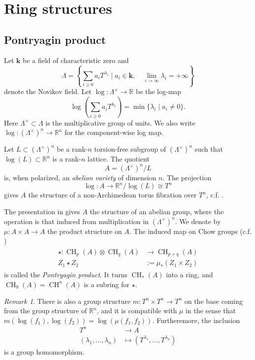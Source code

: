 \documentclass[10pt]{amsart}
\theoremstyle{definition}
\theoremstyle{remark}
\newtheorem{rmk}[thm]{Remark}
\def\R{\mathbb{R}}
\DeclareMathOperator{\CH}{CH}
\def\x{\times}
\begin{document}
  
\section{Ring structures}
\subsection{Pontryagin product}\label{sec:pontryagin}
Let $\mathbf k$ be a field of characteristic zero and 
$$
\Lambda = \left\lbrace \sum_{i\geq0} a_i T^{\lambda_i} \mid a_i \in \mathbf{k},\quad \lim_{i\to\infty} \lambda_i =+\infty\right\rbrace
$$
denote the Novikov field.
Let $\log : \Lambda^\x \to \R$ be the log-map
$$
    \log\left(\sum_{i\geq0} a_i T^{\lambda_i}\right) = \min\lbrace \lambda_i \mid a_i \neq 0\rbrace.
$$
Here $\Lambda^\x \subset \Lambda$ is the multiplicative group of units.
We also write $\log: (\Lambda^\x)^n \to \R^n$ for the component-wise log map.

Let $L \subset (\Lambda^\x)^n$ be a rank-$n$ torsion-free subgroup of $(\Lambda^\x)^n$ such that $\log(L) \subset \R^n$ is a rank-$n$ lattice. 
The quotient 
\begin{equation}\label{eq:Aisquotient}
    A = (\Lambda^\x)^n / L
\end{equation}
is, when polarized, an \emph{abelian variety} of dimension $n$.
The projection
$$
\log : A \to \R^n/\log(L) \cong T^n
$$
gives $A$ the structure of a non-Archimedean torus fibration over $T^n$, c.f. \cite{nicaise2019non}.

The presentation in  gives $A$ the structure of an abelian group, where the operation is that induced from multiplication in $(\Lambda^\x)^n$.
We denote by $\mu: A \x A \to A$ the product structure on $A$.
The induced map on Chow groups (c.f. )
\begin{align}\label{eq:pontryaginproductalg}
    \begin{split}
        \star:\CH_p(A) \otimes \CH_q(A) &\to \CH_{p+q}(A)\\
        Z_1 \star Z_2 &:= \mu_*(Z_1 \x Z_2)
    \end{split}
\end{align}
is called the \emph{Pontryagin product}.
It turns $\CH_*(A)$ into a ring, and $\CH_0(A) = \CH^n(A)$ is a subring for $\star$.
\begin{rmk}\label{rmk:compatiblegroupstructures}
    There is also a group structure $m:T^n \x T^n \to T^n$  on the base coming from the group structure of $\R^n$, and it is compatible with $\mu$ in the sense that $m(\log(f_1),\log(f_2)) = \log(\mu(f_1,f_2))$.
    Furtheremore, the inclusion
    \begin{align*}
        T^n &\to A \\
        (\lambda_1,\dots,\lambda_n) &\mapsto \left(T^{\lambda_1},\dots,T^{\lambda_n}\right)
    \end{align*}
    is a group homomorphism.
\end{rmk}
\end{document}
